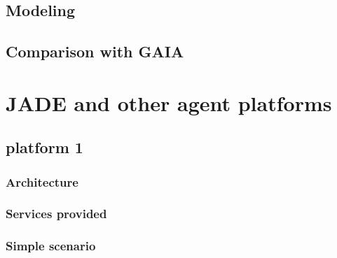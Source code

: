 \documentclass[a4paper,11pt]{report}
\begin{document}
  \subsection{Modeling}
  
  \subsection{Comparison with GAIA}

  
  
  
  \section{JADE and other agent platforms} %
  
  
  \subsection{platform 1} %
  
  \subsubsection{Architecture}
  
  \subsubsection{Services provided}
  
  \subsubsection{Simple scenario}
  
\end{document}
